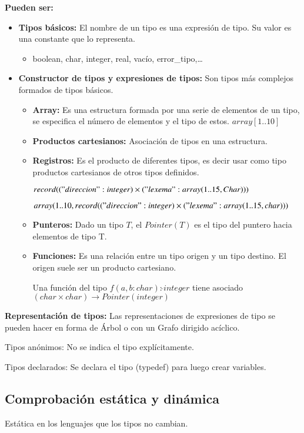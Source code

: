 \documentclass[12pt, twoside, openright]{report} %
\begin{document}
\textbf{Pueden ser:}
\begin{itemize}
	\item \textbf{Tipos básicos:} El nombre de un tipo es una expresión de tipo. Su valor es una constante que lo representa.
	      \begin{itemize}
		      \item boolean, char, integer, real, vacío, error\_tipo,\dots
	      \end{itemize}
	\item \textbf{Constructor de tipos y expresiones de tipos:} Son tipos más complejos formados de tipos básicos.
	      \begin{itemize}
		      \item \textbf{Array:} Es una estructura formada por una serie de elementos de un tipo, se especifica el número de elementos y el tipo de estos. $array[1\text{..}10]$
		      \item \textbf{Productos cartesianos:} Asociación de tipos en una estructura.
		      \item \textbf{Registros:} Es el producto de diferentes tipos, es decir usar como tipo productos cartesianos de otros tipos definidos.

		            $record (("direccion" : integer) \times ("lexema" : array(1..15, Char)))$

		            $array(1\text{..}10, record (("direccion" : integer) \times ("lexema" : array(1\text{..}15,char)))$
		      \item \textbf{Punteros:} Dado un tipo $T$, el $Pointer(T)$ es el tipo del puntero hacia elementos de tipo T.
		      \item \textbf{Funciones:} Es una relación entre un tipo origen y un tipo destino. El origen suele ser un producto cartesiano.

		            Una función del tipo $f(a,b:char) : \hat{} integer$ tiene asociado $(char \times char) \rightarrow Pointer(integer)$
	      \end{itemize}
\end{itemize}
\textbf{Representación de tipos:}
Las representaciones de expresiones de tipo se pueden hacer en forma de Árbol o con un Grafo dirigido acíclico.

Tipos anónimos: No se indica el tipo explícitamente.

Tipos declarados: Se declara el tipo (typedef) para luego crear variables.


\subsection{Comprobación estática y dinámica}
Estática en los lenguajes que los tipos no cambian.
\end{document}
